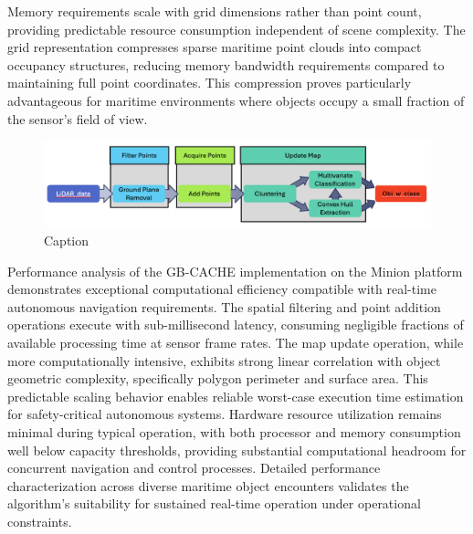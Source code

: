 \documentclass{erauthesis}
\begin{document}
Memory requirements scale with grid dimensions rather than point count, providing predictable resource consumption independent of scene complexity.
The grid representation compresses sparse maritime point clouds into compact occupancy structures, reducing memory bandwidth requirements compared to maintaining full point coordinates.
This compression proves particularly advantageous for maritime environments where objects occupy a small fraction of the sensor's field of view.

\begin{figure}
    \centering
    \includegraphics[width=0.5\linewidth]{Images/gbcache_flow.png}
    \caption{Caption}
    \label{fig:gbcache_flow}
\end{figure}

Performance analysis of the \ac{GB-CACHE} implementation on the Minion platform demonstrates exceptional computational efficiency compatible with real-time autonomous navigation requirements.
The spatial filtering and point addition operations execute with sub-millisecond latency, consuming negligible fractions of available processing time at sensor frame rates.
The map update operation, while more computationally intensive, exhibits strong linear correlation with object geometric complexity, specifically polygon perimeter and surface area.
This predictable scaling behavior enables reliable worst-case execution time estimation for safety-critical autonomous systems.
Hardware resource utilization remains minimal during typical operation, with both processor and memory consumption well below capacity thresholds, providing substantial computational headroom for concurrent navigation and control processes.
Detailed performance characterization across diverse maritime object encounters validates the algorithm's suitability for sustained real-time operation under operational constraints.
\end{document}
